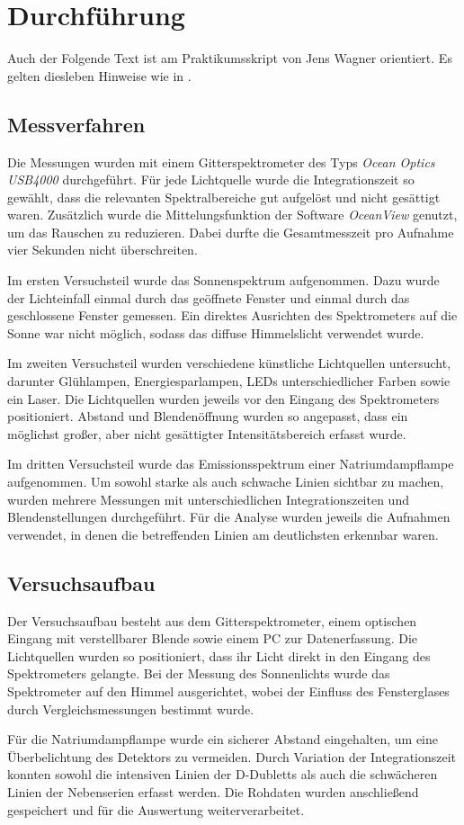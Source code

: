 \chapter{Durchführung} \label{ch:Durchfuehrung}

Auch der Folgende Text ist am Praktikumsskript von Jens Wagner orientiert. Es gelten diesleben Hinweise wie in .\cite{skriptPAP21,Duden}

\section{Messverfahren}

Die Messungen wurden mit einem Gitterspektrometer des Typs \emph{Ocean Optics USB4000} durchgeführt. Für jede Lichtquelle wurde die Integrationszeit so gewählt, dass die relevanten Spektralbereiche gut aufgelöst und nicht gesättigt waren. Zusätzlich wurde die Mittelungsfunktion der Software \emph{OceanView} genutzt, um das Rauschen zu reduzieren. Dabei durfte die Gesamtmesszeit pro Aufnahme vier Sekunden nicht überschreiten.

Im ersten Versuchsteil wurde das Sonnenspektrum aufgenommen. Dazu wurde der Lichteinfall einmal durch das geöffnete Fenster und einmal durch das geschlossene Fenster gemessen. Ein direktes Ausrichten des Spektrometers auf die Sonne war nicht möglich, sodass das diffuse Himmelslicht verwendet wurde.

Im zweiten Versuchsteil wurden verschiedene künstliche Lichtquellen untersucht, darunter Glühlampen, Energiesparlampen, LEDs unterschiedlicher Farben sowie ein Laser. Die Lichtquellen wurden jeweils vor den Eingang des Spektrometers positioniert. Abstand und Blendenöffnung wurden so angepasst, dass ein möglichst großer, aber nicht gesättigter Intensitätsbereich erfasst wurde.

Im dritten Versuchsteil wurde das Emissionsspektrum einer Natriumdampflampe aufgenommen. Um sowohl starke als auch schwache Linien sichtbar zu machen, wurden mehrere Messungen mit unterschiedlichen Integrationszeiten und Blendenstellungen durchgeführt. Für die Analyse wurden jeweils die Aufnahmen verwendet, in denen die betreffenden Linien am deutlichsten erkennbar waren.

\section{Versuchsaufbau}

Der Versuchsaufbau besteht aus dem Gitterspektrometer, einem optischen Eingang mit verstellbarer Blende sowie einem PC zur Datenerfassung. Die Lichtquellen wurden so positioniert, dass ihr Licht direkt in den Eingang des Spektrometers gelangte. Bei der Messung des Sonnenlichts wurde das Spektrometer auf den Himmel ausgerichtet, wobei der Einfluss des Fensterglases durch Vergleichsmessungen bestimmt wurde.

Für die Natriumdampflampe wurde ein sicherer Abstand eingehalten, um eine Überbelichtung des Detektors zu vermeiden. Durch Variation der Integrationszeit konnten sowohl die intensiven Linien der D-Dubletts als auch die schwächeren Linien der Nebenserien erfasst werden. Die Rohdaten wurden anschließend gespeichert und für die Auswertung weiterverarbeitet.
